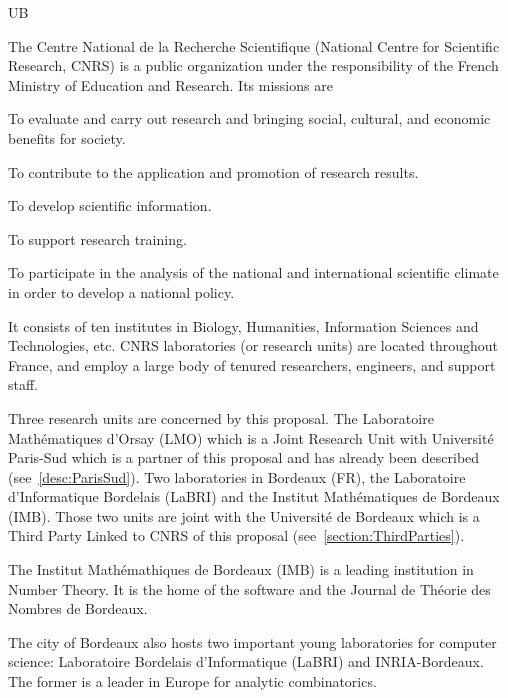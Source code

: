\begin{sitedescription}{UB} \label{desc:Bordeaux}


The Centre National de la Recherche Scientifique (National Centre for
Scientific Research, CNRS) is a public organization under the responsibility of
the French Ministry of Education and Research. Its missions are
\begin{compactitem}
\item To evaluate and carry out research and
bringing social, cultural, and economic benefits for society.
\item To contribute to the application and promotion of research results.
\item To develop scientific information.
\item To support research training.
\item To participate in the analysis of the national and international
scientific climate in order to develop a
national policy.
\end{compactitem}
It consists of ten institutes in Biology, Humanities, Information Sciences and
Technologies, etc. CNRS laboratories (or research units) are located throughout
France, and employ a large body of tenured researchers, engineers, and support
staff.

Three research units are concerned by this proposal. The Laboratoire
Math\'ematiques d'Orsay (LMO) which is a Joint Research Unit with Universit\'e Paris-Sud
which is a partner of this proposal and has already been described
(see~\ref{desc:ParisSud}). Two laboratories in Bordeaux (FR), the Laboratoire
d'Informatique Bordelais (LaBRI) and the Institut Math\'ematiques de
Bordeaux (IMB). Those two units are joint with the Universit\'e de
Bordeaux which is a Third Party Linked to CNRS of this proposal
(see~\ref{section:ThirdParties}).

The Institut Math\'emathiques de Bordeaux (IMB) is a leading
institution in Number Theory. It is the home of the software
\PariGP and the Journal de Th\'eorie des Nombres de Bordeaux.

The city of Bordeaux also hosts two important young laboratories
for computer science: Laboratoire Bordelais d'Informatique (LaBRI)
and INRIA-Bordeaux. The former is a leader in Europe for analytic
combinatorics.


\end{sitedescription}
